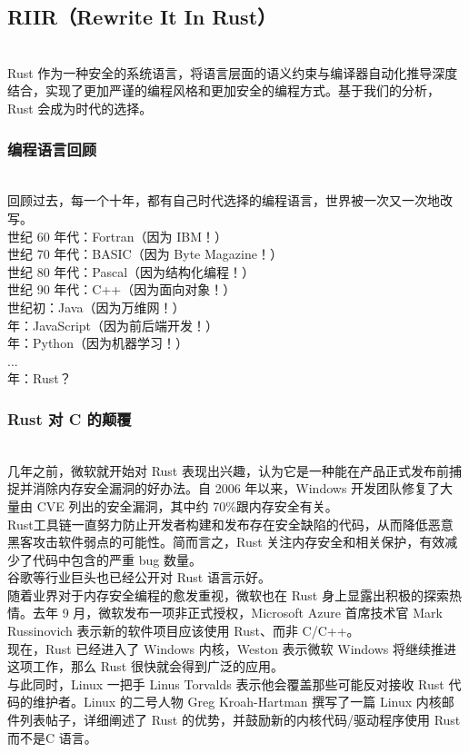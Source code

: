 \subsection{RIIR（Rewrite It In Rust）}\ \\
Rust 作为一种安全的系统语言，将语言层面的语义约束与编译器自动化推导深度结合，实现了更加严谨的编程风格和更加安全的编程方式。基于我们的分析，Rust 会成为时代的选择。
\subsubsection{编程语言回顾}\ \\
\indent 回顾过去，每一个十年，都有自己时代选择的编程语言，世界被一次又一次地改写。\\
 世纪 60 年代：Fortran（因为 IBM！）\\
 世纪 70 年代：BASIC（因为 Byte Magazine！） \\
 世纪 80 年代：Pascal（因为结构化编程！） \\
 世纪 90 年代：C++（因为面向对象！） \\
 世纪初：Java（因为万维网！） \\
 年：JavaScript（因为前后端开发！） \\
 年：Python（因为机器学习！） \\
\indent ... \\
 年：Rust？
\subsubsection{Rust 对 C 的颠覆}\ \\
\indent 几年之前，微软就开始对 Rust 表现出兴趣，认为它是一种能在产品正式发布前捕捉并消除内存安全漏洞的好办法。自 2006 年以来，Windows 开发团队修复了大量由 CVE 列出的安全漏洞，其中约 70\%跟内存安全有关。\\
\indent Rust工具链一直努力防止开发者构建和发布存在安全缺陷的代码，从而降低恶意黑客攻击软件弱点的可能性。简而言之，Rust 关注内存安全和相关保护，有效减少了代码中包含的严重 bug 数量。\\
\indent 谷歌等行业巨头也已经公开对 Rust 语言示好。\\
\indent 随着业界对于内存安全编程的愈发重视，微软也在 Rust 身上显露出积极的探索热情。去年 9 月，微软发布一项非正式授权，Microsoft Azure 首席技术官 Mark Russinovich 表示新的软件项目应该使用 Rust、而非 C/C++。\\
\indent 现在，Rust 已经进入了 Windows 内核，Weston 表示微软 Windows 将继续推进这项工作，那么 Rust 很快就会得到广泛的应用。 \\
\indent 与此同时，Linux 一把手 Linus Torvalds 表示他会覆盖那些可能反对接收 Rust 代码的维护者。Linux 的二号人物 Greg Kroah-Hartman 撰写了一篇 Linux 内核邮件列表帖子，详细阐述了 Rust 的优势，并鼓励新的内核代码/驱动程序使用 Rust 而不是C 语言。\cite{Linux}
